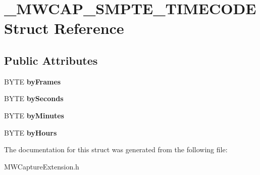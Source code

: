 \hypertarget{struct__MWCAP__SMPTE__TIMECODE}{\section{\-\_\-\-M\-W\-C\-A\-P\-\_\-\-S\-M\-P\-T\-E\-\_\-\-T\-I\-M\-E\-C\-O\-D\-E Struct Reference}
\label{struct__MWCAP__SMPTE__TIMECODE}
}
\subsection*{Public Attributes}
\begin{DoxyCompactItemize}
\item 
\hypertarget{struct__MWCAP__SMPTE__TIMECODE_a02997f31282c8170d0b0b831e45237c1}{B\-Y\-T\-E {\bfseries by\-Frames}}\label{struct__MWCAP__SMPTE__TIMECODE_a02997f31282c8170d0b0b831e45237c1}

\item 
\hypertarget{struct__MWCAP__SMPTE__TIMECODE_a1a3d2a8d946f9174ced510e04bbd17f9}{B\-Y\-T\-E {\bfseries by\-Seconds}}\label{struct__MWCAP__SMPTE__TIMECODE_a1a3d2a8d946f9174ced510e04bbd17f9}

\item 
\hypertarget{struct__MWCAP__SMPTE__TIMECODE_addd32bc4b5349e02d0a10b23480890a4}{B\-Y\-T\-E {\bfseries by\-Minutes}}\label{struct__MWCAP__SMPTE__TIMECODE_addd32bc4b5349e02d0a10b23480890a4}

\item 
\hypertarget{struct__MWCAP__SMPTE__TIMECODE_afe77b58d6b4ff3b5222d98381a7acd7b}{B\-Y\-T\-E {\bfseries by\-Hours}}\label{struct__MWCAP__SMPTE__TIMECODE_afe77b58d6b4ff3b5222d98381a7acd7b}

\end{DoxyCompactItemize}


The documentation for this struct was generated from the following file\-:\begin{DoxyCompactItemize}
\item 
M\-W\-Capture\-Extension.\-h\end{DoxyCompactItemize}
